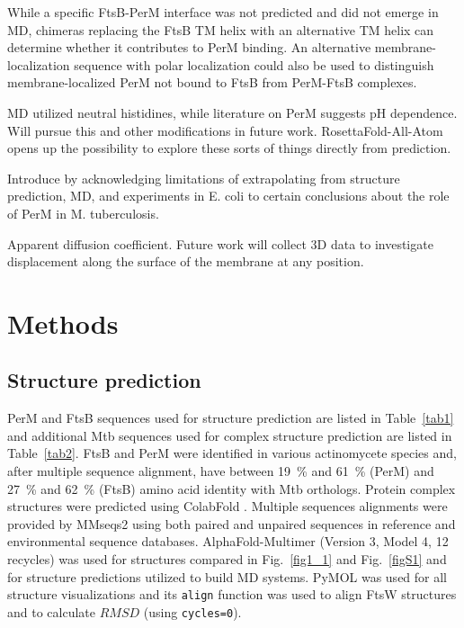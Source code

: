 \documentclass[twocolumn,pdflatex,sn-nature]{sn-jnl}%
\newcommand\mtb{Mtb}
\begin{document}
While a specific FtsB-PerM interface was not predicted and did not emerge in MD, chimeras replacing the FtsB TM helix with an alternative TM helix can determine whether it contributes to PerM binding. An alternative membrane-localization sequence with polar localization could also be used to distinguish membrane-localized PerM not bound to FtsB from PerM-FtsB complexes.

MD utilized neutral histidines, while literature on PerM suggests pH dependence. Will pursue this and other modifications in future work. RosettaFold-All-Atom opens up the possibility to explore these sorts of things directly from prediction.

Introduce by acknowledging limitations of extrapolating from structure prediction, MD, and experiments in E. coli to certain conclusions about the role of PerM in M. tuberculosis.

Apparent diffusion coefficient. Future work will collect 3D data to investigate displacement along the surface of the membrane at any position.



\section{Methods}

\subsection{Structure prediction}

PerM and FtsB sequences used for structure prediction are listed in Table~\ref{tab1} and additional \mtb{} sequences used for complex structure prediction are listed in Table~\ref{tab2}.
FtsB and PerM were identified in various actinomycete species and, after multiple sequence alignment, have between \qty{19}{\percent} and \qty{61}{\percent} (PerM) and  \qty{27}{\percent} and \qty{62}{\percent} (FtsB) amino acid identity with \mtb{} orthologs.
Protein complex structures were predicted using ColabFold \citep{mirditaColabFoldMakingProtein2022}. Multiple sequences alignments were provided by MMseqs2 \citep{steineggerMMseqs2EnablesSensitive2017} using both paired and unpaired sequences in reference and environmental sequence databases.
AlphaFold-Multimer \citep{evansProteinComplexPrediction2022} (Version 3, Model 4, 12 recycles) was used for structures compared in Fig.~\ref{fig1_1} and Fig.~\ref{figS1} and for structure predictions utilized to build MD systems.
PyMOL \citep{delanoPymolOpensourceMolecular2002} was used for all structure visualizations and its \verb|align| function was used to align FtsW structures and to calculate $RMSD$ (using \verb|cycles=0|).
\end{document}
